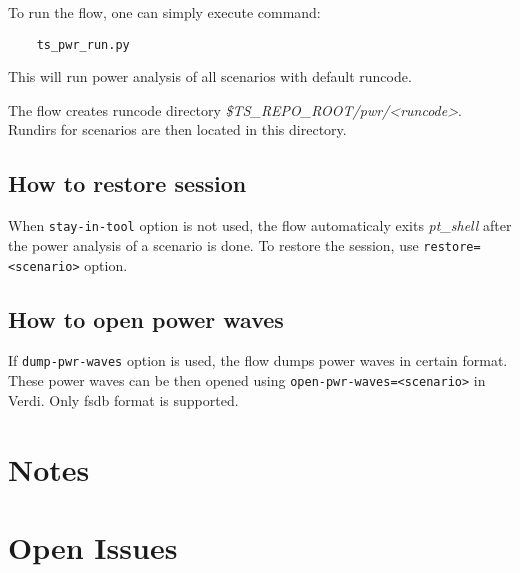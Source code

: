 \documentclass{tropic_design_spec}
\begin{document}
To run the flow, one can simply execute command:
\begin{lstlisting}
    ts_pwr_run.py
\end{lstlisting}

This will run power analysis of all scenarios with default runcode.

\vspace{.5cm}

The flow creates runcode directory \textit{\$TS_REPO_ROOT/pwr/<runcode>}. Rundirs for scenarios are then
located in this directory.

\subsection{How to restore session}

When \texttt{stay-in-tool} option is not used, the flow automaticaly exits \textit{pt_shell} after the
power analysis of a scenario is done. To restore the session, use \texttt{restore=<scenario>} option.

\subsection{How to open power waves}

If \texttt{dump-pwr-waves} option is used, the flow dumps power waves in certain format. These power waves
can be then opened using \texttt{open-pwr-waves=<scenario>} in Verdi. Only fsdb format is supported.

\pagebreak
\section{Notes}

\pagebreak
\section{Open Issues}

\PrintOpenIssueSummary
\end{document}
